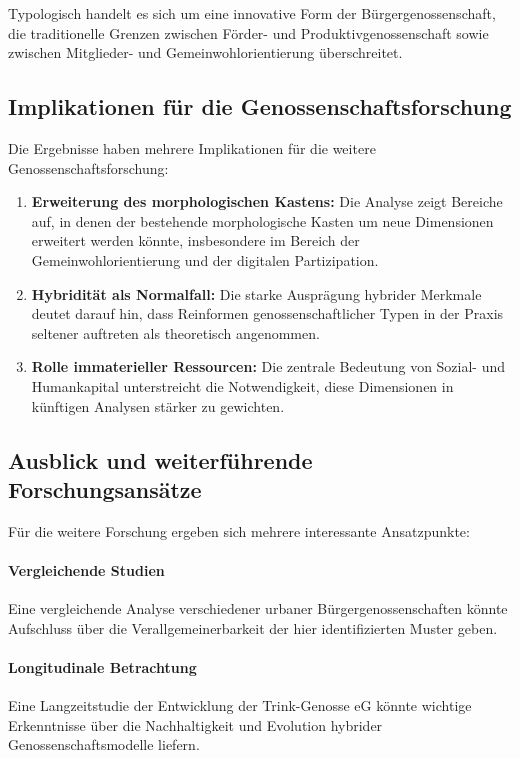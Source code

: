Typologisch handelt es sich um eine innovative Form der Bürgergenossenschaft, die traditionelle Grenzen zwischen Förder- und Produktivgenossenschaft sowie zwischen Mitglieder- und Gemeinwohlorientierung überschreitet.

\subsection{Implikationen für die Genossenschaftsforschung}

Die Ergebnisse haben mehrere Implikationen für die weitere Genossenschaftsforschung:

\begin{enumerate}
\item \textbf{Erweiterung des morphologischen Kastens:} Die Analyse zeigt Bereiche auf, in denen der bestehende morphologische Kasten um neue Dimensionen erweitert werden könnte, insbesondere im Bereich der Gemeinwohlorientierung und der digitalen Partizipation.

\item \textbf{Hybridität als Normalfall:} Die starke Ausprägung hybrider Merkmale deutet darauf hin, dass Reinformen genossenschaftlicher Typen in der Praxis seltener auftreten als theoretisch angenommen.

\item \textbf{Rolle immaterieller Ressourcen:} Die zentrale Bedeutung von Sozial- und Humankapital unterstreicht die Notwendigkeit, diese Dimensionen in künftigen Analysen stärker zu gewichten.
\end{enumerate}

\subsection{Ausblick und weiterführende Forschungsansätze}

Für die weitere Forschung ergeben sich mehrere interessante Ansatzpunkte:

\paragraph{Vergleichende Studien}
Eine vergleichende Analyse verschiedener urbaner Bürgergenossenschaften könnte Aufschluss über die Verallgemeinerbarkeit der hier identifizierten Muster geben.

\paragraph{Longitudinale Betrachtung}
Eine Langzeitstudie der Entwicklung der Trink-Genosse eG könnte wichtige Erkenntnisse über die Nachhaltigkeit und Evolution hybrider Genossenschaftsmodelle liefern.

